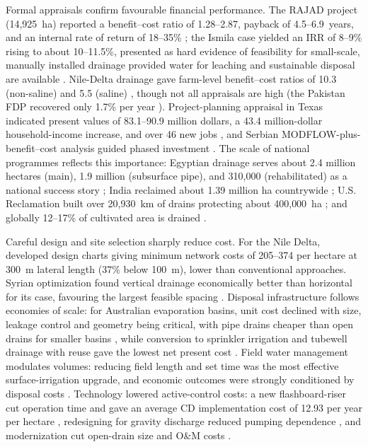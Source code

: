 Formal appraisals confirm favourable financial performance. The RAJAD project
(14{,}925~ha) reported a benefit--cost ratio of 1.28--2.87, payback of
4.5--6.9~years, and an internal rate of return of 18--35\%
\parencite{Gopalakrishnan2007}; the Ismila case yielded an IRR of 8--9\% rising to
about 10--11.5\%, presented as hard evidence of feasibility for small-scale,
manually installed drainage provided water for leaching and sustainable disposal
are available \parencite{Datta2000,Datta2002}. Nile-Delta drainage gave farm-level
benefit--cost ratios of 10.3 (non-saline) and 5.5 (saline) \parencite{Wichelns2002},
though not all appraisals are high (the Pakistan FDP recovered only 1.7\% per year
\parencite{Ghumman2011}). Project-planning appraisal in Texas indicated present
values of 83.1--90.9 million dollars, a 43.4 million-dollar household-income
increase, and over 46 new jobs \parencite{ROBINSON1992}, and Serbian
MODFLOW-plus-benefit--cost analysis guided phased investment
\parencite{Bozic2014}. The scale of national programmes reflects this importance:
Egyptian drainage serves about 2.4 million hectares (main), 1.9 million
(subsurface pipe), and 310{,}000 (rehabilitated) as a national success story
\parencite{AbdelDayem2007}; India reclaimed about 1.39 million ha countrywide
\parencite{Gopalakrishnan2007}; U.S. Reclamation built over 20{,}930~km of drains
protecting about 400{,}000~ha \parencite{TeKrony2004}; and globally 12--17\% of
cultivated area is drained \parencite{Valipour2014}.

Careful design and site selection sharply reduce cost. For the Nile Delta,
\textcite{Gabr2024} developed design charts giving minimum network costs of
205--374 per hectare at 300~m lateral length (37\% below 100~m), lower than
conventional approaches. Syrian optimization found vertical drainage economically
better than horizontal for its case, favouring the largest feasible spacing
\parencite{Bakour2021}. Disposal infrastructure follows economies of scale: for
Australian evaporation basins, unit cost declined with size, leakage control and
geometry being critical, with pipe drains cheaper than open drains for smaller
basins \parencite{Singh2001}, while conversion to sprinkler irrigation and
tubewell drainage with reuse gave the lowest net present cost
\parencite{Bethune2008}. Field water management modulates volumes: reducing field
length and set time was the most effective surface-irrigation upgrade, and
economic outcomes were strongly conditioned by disposal costs
\parencite{HANSON1994}. Technology lowered active-control costs: a new
flashboard-riser cut operation time and gave an average CD implementation cost of
12.93 per year per hectare \parencite{Napierala2024}, redesigning for gravity
discharge reduced pumping dependence \parencite{Imran2021}, and modernization cut
open-drain size and O\&M costs \parencite{Ritzema2023}.

